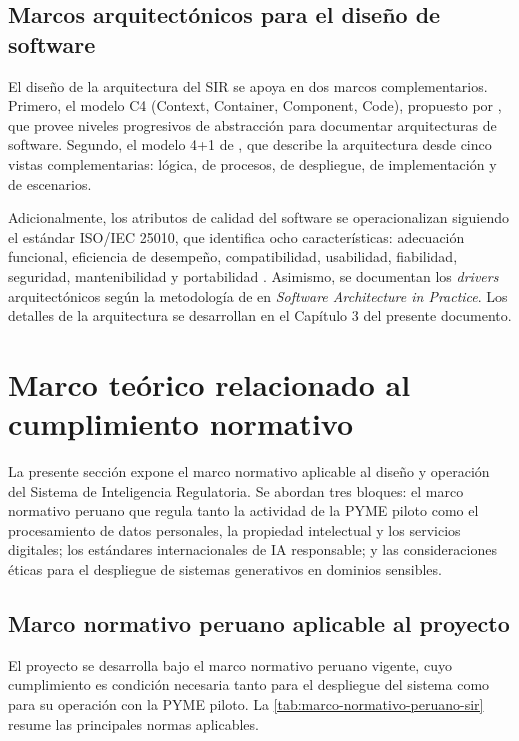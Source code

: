 \documentclass[12pt,a4paper,oneside]{report}
\begin{document}
\subsection{Marcos arquitectónicos para el diseño de software}\label{subsec:marcos-arquitectonicos-diseno-software}

El diseño de la arquitectura del SIR se apoya en dos marcos complementarios. Primero, el modelo C4 (Context, Container, Component, Code), propuesto por \textcite{brown2018}, que provee niveles progresivos de abstracción para documentar arquitecturas de software. Segundo, el modelo 4+1 de \textcite{kruchten1995}, que describe la arquitectura desde cinco vistas complementarias: lógica, de procesos, de despliegue, de implementación y de escenarios.

Adicionalmente, los atributos de calidad del software se operacionalizan siguiendo el estándar ISO/IEC 25010, que identifica ocho características: adecuación funcional, eficiencia de desempeño, compatibilidad, usabilidad, fiabilidad, seguridad, mantenibilidad y portabilidad \parencite{iso25010}. Asimismo, se documentan los \textit{drivers} arquitectónicos según la metodología de \textcite{bass2021} en \textit{Software Architecture in Practice}. Los detalles de la arquitectura se desarrollan en el Capítulo 3 del presente documento.

\section{Marco teórico relacionado al cumplimiento normativo}\label{sec:marco-teorico-cumplimiento-normativo}

La presente sección expone el marco normativo aplicable al diseño y operación del Sistema de Inteligencia Regulatoria. Se abordan tres bloques: el marco normativo peruano que regula tanto la actividad de la PYME piloto como el procesamiento de datos personales, la propiedad intelectual y los servicios digitales; los estándares internacionales de IA responsable; y las consideraciones éticas para el despliegue de sistemas generativos en dominios sensibles.

\subsection{Marco normativo peruano aplicable al proyecto}\label{subsec:marco-normativo-peruano-proyecto}

El proyecto se desarrolla bajo el marco normativo peruano vigente, cuyo cumplimiento es condición necesaria tanto para el despliegue del sistema como para su operación con la PYME piloto. La \cref{tab:marco-normativo-peruano-sir} resume las principales normas aplicables.
\end{document}

